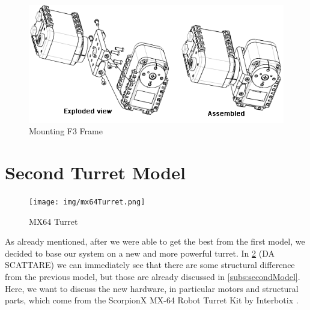 \begin{figure}
	\centering
	\includegraphics[width=\textwidth]{img/axMounting2.png}%
	\caption{Mounting F3 Frame}
	\label{fig:axMounting2}
\end{figure}
\section{Second Turret Model}\label{sec:turret64}
\begin{figure}
	\centering
	\texttt{[image: img/mx64Turret.png]}%
	\caption{MX64 Turret}
	\label{fig:mx64Turret}
\end{figure}
As already mentioned, after we were able to get the best from the first model, we decided to base our system on a new and more powerful turret. In \ref{fig:mx64Turret} (DA SCATTARE) we can immediately see that there are some structural difference from the previous model, but those are already discussed in \ref{subs:secondModel}. Here, we want to discuss the new hardware, in particular motors and structural parts, which come from the ScorpionX MX-64 Robot Turret Kit by Interbotix \cite{MX64Turret}.
